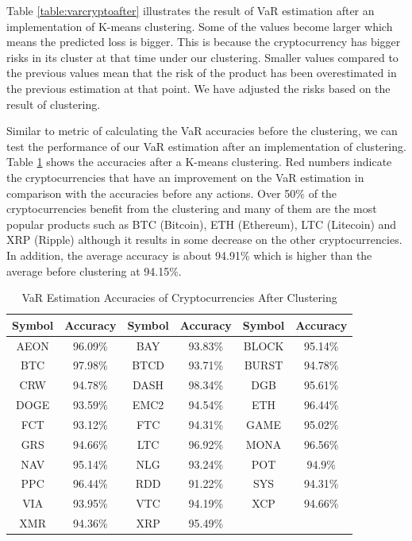 \documentclass[11pt]{article} %
\theoremstyle{plain}
\theoremstyle{definition}
\begin{document}
Table \ref{table:varcryptoafter} illustrates the result of VaR estimation after an implementation of K-means clustering. Some of the values become larger which means the predicted loss is bigger. This is because the cryptocurrency has bigger risks in its cluster at that time under our clustering. Smaller values compared to the previous values mean that the risk of the product has been overestimated in the previous estimation at that point. We have adjusted the risks based on the result of clustering.

Similar to metric of calculating the VaR accuracies before the clustering, we can test the performance of our VaR estimation after an implementation of clustering. Table \ref{table:acccryptoafter} shows the accuracies after a K-means clustering. Red numbers indicate the cryptocurrencies that have an improvement on the VaR estimation in comparison with the accuracies before any actions. Over 50\% of the cryptocurrencies benefit from the clustering and many of them are the most popular products such as BTC (Bitcoin), ETH (Ethereum), LTC (Litecoin) and XRP (Ripple) although it results in some decrease on the other cryptocurrencies. In addition, the average accuracy is about 94.91\% which is higher than the average before clustering at 94.15\%.

{
  \begin{table}[ht]
    \centering
    \small
    \begin{tabular}{|c|c|c|c|c|c|}
        \hline
        Symbol & Accuracy & Symbol & Accuracy & Symbol & Accuracy \\
        \hline
        AEON & \color{red}96.09\% & BAY & 93.83\% & BLOCK & \color{red}95.14\% \\
        BTC & \color{red}97.98\% & BTCD & 93.71\% & BURST & \color{red}94.78\% \\
        CRW & 94.78\% & DASH & \color{red}98.34\% & DGB & \color{red}95.61\% \\
        DOGE & 93.59\% & EMC2 & 94.54\% & ETH & \color{red}96.44\% \\
        FCT & 93.12\% & FTC & 94.31\% & GAME & \color{red}95.02\% \\
        GRS & \color{red}94.66\% & LTC & \color{red}96.92\% & MONA & \color{red}96.56\% \\
        NAV & \color{red}95.14\% & NLG & 93.24\% & POT & \color{red}94.9\% \\
        PPC & \color{red}96.44\% & RDD & 91.22\% & SYS & \color{red}94.31\% \\
        VIA & 93.95\% & VTC & \color{red}94.19\% & XCP & \color{red}94.66\% \\
        XMR & 94.36\% & XRP & \color{red}95.49\% & & \\
        \hline
    \end{tabular}
    \caption{VaR Estimation Accuracies of Cryptocurrencies After Clustering}
    \label{table:acccryptoafter}
  \end{table}
}
\end{document}
